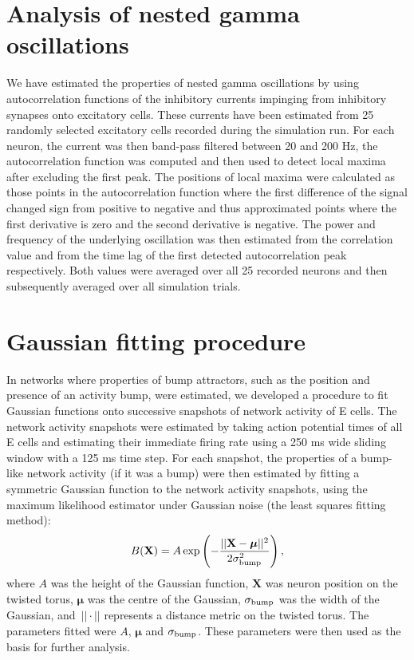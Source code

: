 \documentclass[a4paper,12pt]{article}
\newcommand{\ssc}[3]{\ensuremath{#1_{\text{#2}_{\text{#3}}}}}
\newcommand{\sigmasub}[1]{\ssc{\sigma}{\scriptsize{#1}}{}}
\begin{document}
\section{Analysis of nested gamma oscillations}

We have estimated the properties of nested gamma oscillations by using
autocorrelation functions of the inhibitory currents impinging from inhibitory
synapses onto excitatory cells. These currents have been estimated from 25
randomly selected excitatory cells recorded during the simulation run.  For
each neuron, the current was then band-pass filtered between 20 and 200 Hz, the
autocorrelation function was computed and then used to detect local maxima
after excluding the first peak. The positions of local maxima were calculated
as those points in the autocorrelation function where the first difference of
the signal changed sign from positive to negative and thus approximated points
where the first derivative is zero and the second derivative is negative.  The
power and frequency of the underlying oscillation was then estimated from the
correlation value and from the time lag of the first detected autocorrelation
peak respectively. Both values were averaged over all 25 recorded neurons and
then subsequently averaged over all simulation trials.

\section{Gaussian fitting procedure} \label{sec:gauss_fitting}

In networks where properties of bump attractors, such as the position and
presence of an activity bump, were estimated, we developed a procedure to fit
Gaussian functions onto successive snapshots of network activity of E cells.
The network activity snapshots were estimated by taking action potential times
of all E cells and estimating their immediate firing rate using a 250 ms wide
sliding window with a 125 ms time step. For each snapshot, the properties of a
bump-like network activity (if it was a bump) were then estimated by fitting a
symmetric Gaussian function to the network activity snapshots, using the
maximum likelihood estimator under Gaussian noise (the least squares
fitting method):
\begin{equation}
    B(\mathbf{X}) = A \exp\left(
        -\frac{||\mathbf{X} - \bm{\mu}||^2}{2\sigmasub{bump}^2} \right),
    \label{eq:noise_bump_fitting}
\end{equation}
where $A$ was the height of the Gaussian function, $\mathbf{X}$ was neuron position
on the twisted torus, $\bm{\mu}$ was the centre of the Gaussian,
$\sigmasub{bump}$ was the width of the Gaussian, and~$||\cdot||$ represents a
distance metric on the twisted torus. The parameters fitted were $A$,
$\bm{\mu}$ and $\sigmasub{bump}$. These parameters were then used as the basis
for further analysis.
\end{document}
